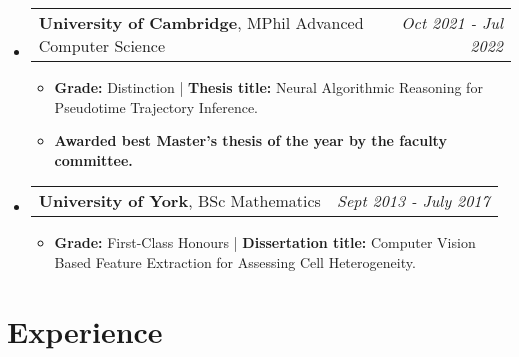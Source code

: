 \documentclass[letterpaper,11pt]{article}
\makeatletter
\newcommand{\resumeitem}[1]{
  \item{
    {#1 \vspace{0pt}}
  }
}
\newcommand{\resumesubheading}[4]{
  \vspace{2pt}\item
    \begin{tabular*}{0.97\textwidth}[t]{l@{\extracolsep{\fill}}r}
      \textbf{#1}, {#3} & \textit{#4} \\
    \end{tabular*}\vspace{-3pt}
}
\newcommand{\resumesubheadingliststart}{\begin{itemize}[leftmargin=0.15in, label={}]}
\newcommand{\resumesubheadinglistend}{\end{itemize}}
\newcommand{\resumeitemliststart}{\begin{itemize}}
\newcommand{\resumeitemlistend}{\end{itemize}\vspace{-3pt}}
\makeatother
\begin{document}
\resumesubheadingliststart
    \resumesubheading
      {University of Cambridge}{Cambridge, UK}
      {MPhil Advanced Computer Science}{Oct 2021 - Jul 2022}
      \resumeitemliststart
        \resumeitem{\textbf{Grade:} Distinction | \textbf{Thesis title:} Neural Algorithmic Reasoning for Pseudotime Trajectory Inference.} 
        \resumeitem{\textbf{Awarded best Master's thesis of the year by the faculty committee.}}
      \resumeitemlistend
      \vspace{-0.5em}
    \resumesubheading
      {University of York}{York, UK}
      {BSc Mathematics}{Sept 2013 - July 2017}
      \resumeitemliststart
        \resumeitem{\textbf{Grade:} First-Class Honours | \textbf{Dissertation title:} Computer Vision Based Feature Extraction for Assessing Cell Heterogeneity.}
      \resumeitemlistend
\resumesubheadinglistend

\section{Experience}
\end{document}
